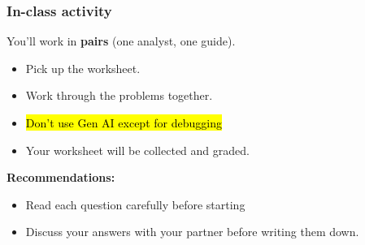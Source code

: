 \documentclass[slidestop,compress,mathserif]{beamer}
\begin{document}

\begin{frame}
\frametitle{In-class activity}

You'll work in \textbf{pairs} (one analyst, one guide).

\medskip
\begin{itemize}
\item Pick up the worksheet.
\item Work through the problems together.
\item \hl{Don't use Gen AI except for debugging}
\item Your worksheet will be collected and graded.
\end{itemize}

\medskip
\textbf{Recommendations:}
\begin{itemize}
\item Read each question carefully before starting
\item Discuss your answers with your partner before writing them down.
\end{itemize}

\end{frame}
\end{document}

